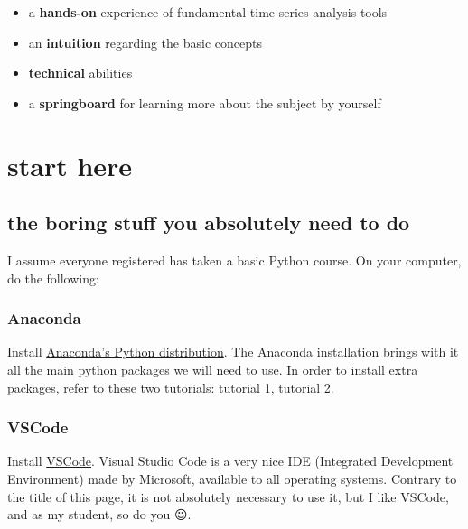 \documentclass[
  letterpaper,
  DIV=11,
  numbers=noendperiod,
  oneside]{scrreprt}
\providecommand{\tightlist}{%
  \setlength{\itemsep}{0pt}\setlength{\parskip}{0pt}}\usepackage{longtable,booktabs,array}
\begin{document}
\begin{itemize}
\tightlist
\item
  a \textbf{hands-on} experience of fundamental time-series analysis
  tools
\item
  an \textbf{intuition} regarding the basic concepts
\item
  \textbf{technical} abilities
\item
  a \textbf{springboard} for learning more about the subject by yourself
\end{itemize}

\part{start here}

\hypertarget{the-boring-stuff-you-absolutely-need-to-do}{%
\chapter{the boring stuff you absolutely need to
do}\label{the-boring-stuff-you-absolutely-need-to-do}}

I assume everyone registered has taken a basic Python course. On your
computer, do the following:

\hypertarget{anaconda}{%
\section{Anaconda}\label{anaconda}}

Install \href{https://www.anaconda.com/download}{Anaconda's Python
distribution}. The Anaconda installation brings with it all the main
python packages we will need to use. In order to install extra packages,
refer to these two tutorials:
\href{https://www.tutorialspoint.com/how-do-i-install-python-packages-in-anaconda}{tutorial
1},
\href{https://docs.anaconda.com/free/anaconda/packages/install-packages.html}{tutorial
2}.

\hypertarget{vscode}{%
\section{VSCode}\label{vscode}}

Install \href{https://code.visualstudio.com/download}{VSCode}. Visual
Studio Code is a very nice IDE (Integrated Development Environment) made
by Microsoft, available to all operating systems. Contrary to the title
of this page, it is not absolutely necessary to use it, but I like
VSCode, and as my student, so do you 😉.
\end{document}
